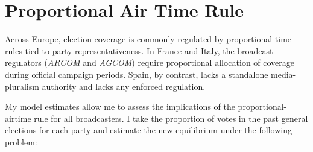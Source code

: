 \documentclass[12pt]{article}
\begin{document}
	
	
	
	
	
	
	
	
	\FloatBarrier
	
	
	
	
	
	
	
	
	
	
	\section{Proportional Air Time Rule}
	
	\label{sec:counter}
	
	
	Across Europe, election coverage is commonly regulated by proportional-time rules tied to party representativeness. In France and Italy, the broadcast regulators (\textit{ARCOM} and \textit{AGCOM}) require proportional allocation of coverage during official campaign periods. Spain, by contrast,  lacks a standalone media-pluralism authority and lacks any enforced regulation. 
	
	
	
	
	
	
	My model estimates allow me to assess the  implications of the proportional-airtime rule for all broadcasters.  I take the proportion of votes in the past general elections for each party and estimate the new equilibrium under the following problem: 
	
\end{document}
